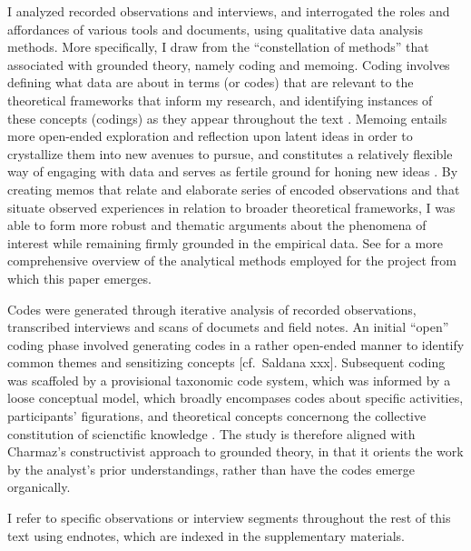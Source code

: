 \documentclass[
]{article}
\begin{document}
I analyzed recorded observations and interviews, and interrogated the
roles and affordances of various tools and documents, using qualitative
data analysis methods. More specifically, I draw from the
``constellation of methods'' that \textcite[14-15]{charmaz2014}
associated with grounded theory, namely coding and memoing. Coding
involves defining what data are about in terms (or codes) that are
relevant to the theoretical frameworks that inform my research, and
identifying instances of these concepts (codings) as they appear
throughout the text \autocite[43]{charmaz2014}. Memoing entails more
open-ended exploration and reflection upon latent ideas in order to
crystallize them into new avenues to pursue, and constitutes a
relatively flexible way of engaging with data and serves as fertile
ground for honing new ideas \autocite[72]{charmaz2014}. By creating
memos that relate and elaborate series of encoded observations and that
situate observed experiences in relation to broader theoretical
frameworks, I was able to form more robust and thematic arguments about
the phenomena of interest while remaining firmly grounded in the
empirical data. See \textcite[9-10]{batist2024a} for a more
comprehensive overview of the analytical methods employed for the
project from which this paper emerges.

Codes were generated through iterative analysis of recorded
observations, transcribed interviews and scans of documets and field
notes. An initial ``open'' coding phase involved generating codes in a
rather open-ended manner to identify common themes and sensitizing
concepts {[}cf.~Saldana xxx{]}. Subsequent coding was scaffoled by a
provisional taxonomic code system, which was informed by a loose
conceptual model, which broadly encompases codes about specific
activities, participants' figurations, and theoretical concepts
concernong the collective constitution of scienctific knowledge
\autocite[see][Appendix B for an overview of the code
system]{batist2023}. The study is therefore aligned with Charmaz's
\autocite*{charmaz2000} constructivist approach to grounded theory, in
that it orients the work by the analyst's prior understandings, rather
than have the codes emerge organically.

I refer to specific observations or interview segments throughout the
rest of this text using endnotes, which are indexed in the supplementary
materials.

\printbibliography
\end{document}
